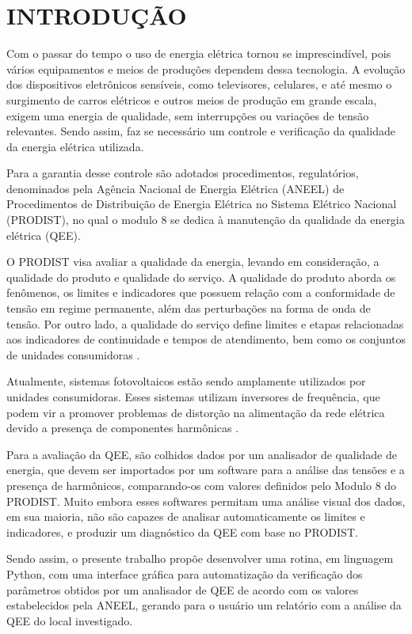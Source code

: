 \chapter{INTRODUÇÃO}

Com o passar do tempo o uso de energia elétrica tornou se imprescindível, pois vários equipamentos e meios de produções dependem dessa tecnologia. A evolução dos dispositivos eletrônicos sensíveis, como televisores, celulares, e até mesmo o surgimento de carros elétricos e outros meios de produção em grande escala, exigem uma energia de qualidade, sem interrupções ou variações de tensão relevantes. Sendo assim, faz se necessário um controle e verificação da qualidade da energia elétrica utilizada.

Para a garantia desse controle são adotados procedimentos, regulatórios, denominados pela Agência Nacional de Energia Elétrica (ANEEL) de Procedimentos de Distribuição de Energia Elétrica no Sistema Elétrico Nacional (PRODIST), no qual o modulo 8 se dedica à manutenção da qualidade da energia elétrica (QEE).

O PRODIST visa avaliar a qualidade da energia, levando em consideração, a qualidade do produto e qualidade do serviço. A qualidade do produto aborda os fenômenos, os limites e indicadores que possuem relação com a conformidade de tensão em regime permanente, além das perturbações na forma de onda de tensão. Por outro lado, a qualidade do serviço define limites e etapas relacionadas aos indicadores de continuidade e tempos de atendimento, bem como os conjuntos de unidades consumidoras \cite{ref:ANEEL2021}.

Atualmente, sistemas fotovoltaicos estão sendo amplamente utilizados por unidades consumidoras. Esses sistemas utilizam inversores de frequência, que podem vir a promover problemas de distorção na alimentação da rede elétrica devido a presença de componentes harmônicas \cite{ref:dugan_2004}.

Para a avaliação da QEE, são colhidos dados por um analisador de qualidade de energia, que devem ser importados por um software para a análise das tensões e a presença de harmônicos, comparando-os com valores definidos pelo Modulo 8 do PRODIST. Muito embora esses softwares permitam uma análise visual dos dados, em sua maioria, não são capazes de analisar automaticamente os limites e indicadores, e produzir um diagnóstico da QEE com base no PRODIST.

Sendo assim, o presente trabalho propõe desenvolver uma rotina, em linguagem Python, com uma interface gráfica para automatização da verificação dos parâmetros obtidos por um analisador de QEE de acordo com os valores estabelecidos pela ANEEL, gerando para o usuário um relatório com a análise da QEE do local investigado.


